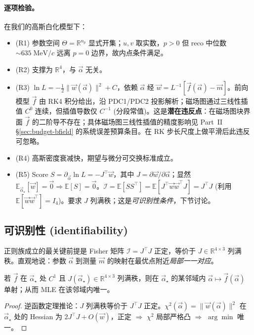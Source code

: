 \paragraph{逐项检验。} 在我们的高斯白化模型下：
\begin{itemize}[nosep]
  \item (R1) 参数空间 $\Theta=\mathbb R^{n_p}$ 显式开集；$u,v$ 取实数，$p>0$ 但 reco 中位数 $\sim 635\;\mathrm{MeV}/c$ 远离 $p=0$ 边界，故内点条件满足。
  \item (R2) 支撑为 $\mathbb R^4$，与 $\vec\alpha$ 无关。
  \item (R3) $\ln L=-\tfrac12\|\vec w(\vec\alpha)\|^2+C$，依赖 $\vec\alpha$ 经 $\vec w=L^{-1}[\vec f(\vec\alpha)-\vec m]$。前向模型 $\vec f$ 由 RK4 积分给出，沿 PDC1/PDC2 投影解析；磁场图通过三线性插值 $C^0$ 连续，但插值导数仅 $C^{-1}$ (分段常值)。这是\textbf{潜在违反点}：在磁场图块界面 $\vec f$ 的二阶导不存在；具体磁场图三线性插值的精度影响见 Part~II §\ref{sec:budget-bfield} 的系统误差预算条目。在 RK 步长尺度上做平滑后此违反可忽略。
  \item (R4) 高斯密度衰减快，期望与微分可交换标准成立。
  \item (R5) Score $S=\partial_{\vec\alpha}\ln L=-J^\top\vec w$，其中 $J=\partial\vec w/\partial\vec\alpha$；显然 $\mathbb E_{\vec\alpha_\star}[\vec w]=\vec 0\Rightarrow\mathbb E[S]=\vec 0$。$\mathcal I=\mathbb E[SS^\top]=\mathbb E[J^\top\vec w\vec w^\top J]=J^\top J$ (利用 $\mathbb E[\vec w\vec w^\top]=I_4$)。要求 $J$ 列满秩；这是\emph{可识别性条件}，下节讨论。
\end{itemize}

\subsection{可识别性 (identifiability)}
\label{sec:partIa:lik:identifiability}

正则族成立的最关键前提是 Fisher 矩阵 $\mathcal I=J^\top J$ 正定，等价于 $J\in\mathbb R^{4\times 3}$ 列满秩。直观地说：参数 $\vec\alpha$ 到测量 $\vec m$ 的映射在最优点附近\emph{局部一一对应}。

\begin{lemma}[局部可识别性]\label{lem:partIa:ident}
  若 $\vec f$ 在 $\vec\alpha_\star$ 处 $C^1$ 且 $J(\vec\alpha_\star)\in\mathbb R^{4\times 3}$ 列满秩，则在 $\vec\alpha_\star$ 的某邻域内 $\vec\alpha\mapsto\vec f(\vec\alpha)$ 单射；从而 MLE 在该邻域内唯一。
\end{lemma}
\begin{proof}
  逆函数定理推论：$J$ 列满秩等价于 $J^\top J$ 正定。$\chi^2(\vec\alpha)=\|\vec w(\vec\alpha)\|^2$ 在 $\vec\alpha_\star$ 处的 Hessian 为 $2J^\top J+O(\vec w)$，正定 $\Rightarrow$ $\chi^2$ 局部严格凸 $\Rightarrow$ $\arg\min$ 唯一。
\end{proof}

